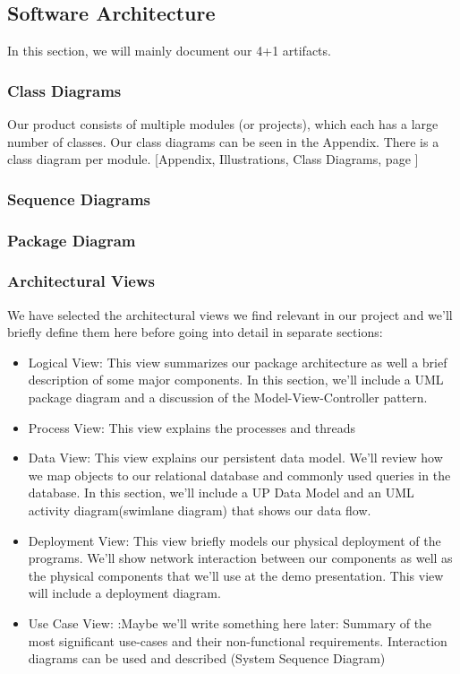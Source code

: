 \subsection{Software Architecture}
In this section, we will mainly document our 4+1 artifacts.
\subsubsection{Class Diagrams}
Our product consists of multiple modules (or projects), which each has a large number of classes. Our class diagrams can be seen in the Appendix. There is a class diagram per module.
[Appendix, Illustrations, Class Diagrams, page \pageref{classdiagrams}]
\subsubsection{Sequence Diagrams}
\subsubsection{Package Diagram}

\subsubsection{Architectural Views}
We have selected the architectural views we find relevant in our project and we’ll briefly define them here before going into detail in separate sections:
\begin{itemize}
\item Logical View: This view summarizes our package architecture as well a brief description of some major components. In this section, we’ll include a UML package diagram and a discussion of the Model-View-Controller pattern.
\item Process View: This view explains the processes and threads
\item Data View: This view explains our persistent data model. We’ll review how we map objects to our relational database and commonly used queries in the database. In this section, we’ll include a UP Data Model and an UML activity diagram(swimlane diagram) that shows our data flow.
\item Deployment View: This view briefly models our physical deployment of the programs. We’ll show network interaction between our components as well as the physical components that we’ll use at the demo presentation. This view will include a deployment diagram.
\item Use Case View: :Maybe we’ll write something here later: Summary of the most significant use-cases and their non-functional requirements. Interaction diagrams can be used and described (System Sequence Diagram)
\end{itemize}
